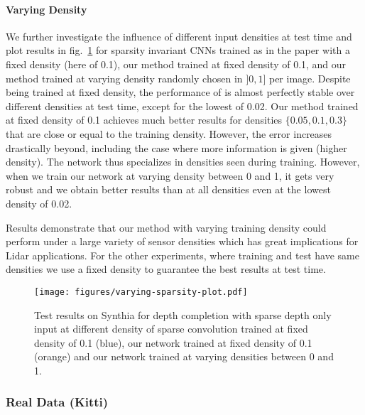 \documentclass[10pt,twocolumn,letterpaper]{article}
\begin{document}
\paragraph{Varying Density}\label{sec:varyingDensitySynthia}
We further investigate the influence of different input densities at test time and plot results in fig.~\ref{fig:varyingSparsityPlot} for sparsity invariant CNNs \cite{uhrig2017sparsity} trained as in the paper with a fixed density (here of 0.1), our method trained at fixed density of 0.1, and our method trained at varying density randomly chosen in $]0,1]$ per image. Despite being trained at fixed density, the performance of \cite{uhrig2017sparsity} is almost perfectly stable over different densities at test time, except for the lowest of 0.02.
Our method trained at fixed density of 0.1 achieves much better results for densities $\{0.05, 0.1, 0.3\}$ that are close or equal to the training density. However, the error increases drastically beyond, including the case where more information is given (higher density). The network thus specializes in densities seen during training.
However, when we train our network at varying density between 0 and 1, it gets very robust and we obtain better results than \cite{uhrig2017sparsity} at all densities even at the lowest density of 0.02.

Results demonstrate that our method with varying training density could perform under a large variety of sensor densities which has great implications for Lidar applications.
For the other experiments, where training and test have same densities we use a fixed density to guarantee the best results at test time.
\begin{figure}
	\centering
	\texttt{[image: figures/varying-sparsity-plot.pdf]}
	\caption{Test results on Synthia for depth completion with sparse depth only input at different density of sparse convolution \cite{uhrig2017sparsity} trained at fixed density of 0.1 (blue), our network trained at fixed density of 0.1 (orange) and our network trained at varying densities between 0 and 1.}
	\label{fig:varyingSparsityPlot}
\end{figure}

\subsubsection{Real Data (Kitti)}
\label{sec:depthCompletionReal}
\end{document}
